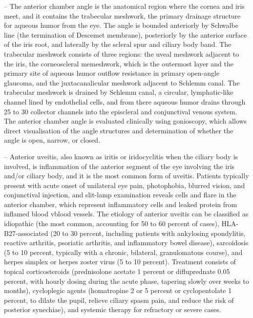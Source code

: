 -- The anterior chamber angle is the anatomical region where the cornea and iris meet, and it contains the trabecular meshwork, the primary drainage structure for aqueous humor from the eye. The angle is bounded anteriorly by Schwalbe line (the termination of Descemet membrane), posteriorly by the anterior surface of the iris root, and laterally by the scleral spur and ciliary body band. The trabecular meshwork consists of three regions: the uveal meshwork adjacent to the iris, the corneoscleral memeshwork, which is the outermost layer and the primary site of aqueous humor outflow resistance in primary open-angle glaucoma, and the juxtacanalicular meshwork adjacent to Schlemm canal. The trabecular meshwork is drained by Schlemm canal, a circular, lymphatic-like channel lined by endothelial cells, and from there aqueous humor drains through 25 to 30 collector channels into the episcleral and conjunctival venous system. The anterior chamber angle is evaluated clinically using gonioscopy, which allows direct visualisation of the angle structures and determination of whether the angle is open, narrow, or closed.

-- Anterior uveitis, also known as iritis or iridocyclitis when the ciliary body is involved, is inflammation of the anterior segment of the eye involving the iris and/or ciliary body, and it is the most common form of uveitis. Patients typically present with acute onset of unilateral eye pain, photophobia, blurred vision, and conjunctival injection, and slit-lamp examination reveals cells and flare in the anterior chamber, which represent inflammatory cells and leaked protein from inflamed blood vblood vessels. The etiology of anterior uveitis can be classified as idiopathic (the most common, accounting for 50 to 60 percent of cases), HLA-B27-associated (20 to 30 percent, including patients with ankylosing spondylitis, reactive arthritis, psoriatic arthritis, and inflammatory bowel disease), sarcoidosis (5 to 10 percent, typically with a chronic, bilateral, granulomatous course), and herpes simplex or herpes zoster virus (5 to 10 percent). Treatment consists of topical corticosteroids (prednisolone acetate 1 percent or difluprednate 0.05 percent, with hourly dosing during the acute phase, tapering slowly over weeks to months), cycloplegic agents (homatropine 2 or 5 percent or cyclopentolate 1 percent, to dilate the pupil, relieve ciliary spasm pain, and reduce the risk of posterior synechiae), and systemic therapy for refractory or severe cases.

